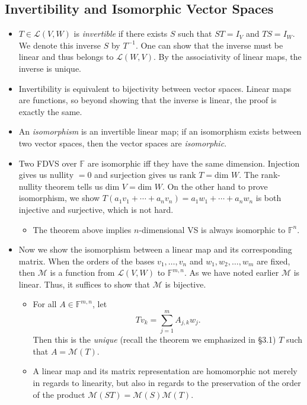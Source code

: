 \documentclass{article}
\newcommand{\F}{\mathbb{F}}
\newcommand{\LVW}{\mathcal{L}(V,W)}
\newcommand{\M}{\mathcal{M}}
\newcommand{\bv}{v_1,\dots,v_n}
\renewcommand{\d}{\text{dim }}
\begin{document}
\subsection{Invertibility and Isomorphic Vector Spaces}
\begin{itemize}
    \item $T \in \LVW$ is \textit{invertible} if there exists $S$ such that $ST = I_V$ and $TS = I_W$. We denote this inverse $S$ by $T^{-1}$. One can show that the inverse must be linear and thus belongs to $\mathcal{L}(W,V)$. By the associativity of linear maps, the inverse is unique.
    \item Invertibility is equivalent to bijectivity between vector spaces. Linear maps are functions, so beyond showing that the inverse is linear, the proof is exactly the same.
    \item An \textit{isomorphism} is an invertible linear map; if an isomorphism exists between two vector spaces, then the vector spaces are \textit{isomorphic}.
    \item Two FDVS over $\F$ are isomorphic iff they have the same dimension. Injection gives us $\text{nullity } = 0$ and surjection gives us $\text{rank } T = \d W$. The rank-nullity theorem tells us $\d V = \d W$. On the other hand to prove isomorphism, we show $T(a_1v_1+\cdots+a_nv_n) = a_1w_1+\cdots+a_nw_n$ is both injective and surjective, which is not hard.
    \begin{itemize}
        \item The theorem above implies $n$-dimensional VS is always isomorphic to $\F^n$.
    \end{itemize}
    \item Now we show the isomorphism between a linear map and its corresponding matrix. When the orders of the bases $\bv$ and $w_1,w_2,\dots,w_m$ are fixed, then $\M$ is a function from $\LVW$ to $\F^{m,n}$. As we have noted earlier $\M$ is linear. Thus, it suffices to show that $\M$ is bijective.
    \begin{itemize}
        \item For all $A \in \F^{m,n}$, let $$Tv_k = \sum_{j = 1}^m A_{j,k}w_j.$$ Then this is the \textit{unique} (recall the theorem we emphasized in \S3.1) $T$ such that $A = \M(T)$.
        \item A linear map and its matrix representation are homomorphic not merely in regards to linearity, but also in regards to the preservation of the order of the product $\M(ST) = \M(S)\M(T)$.
    \end{itemize}

\end{itemize}
\end{document}
